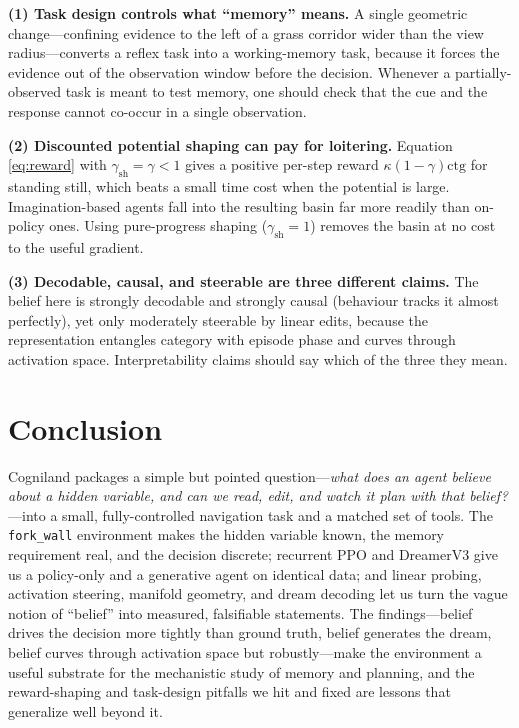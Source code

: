 \documentclass[11pt]{article}
\newcommand{\code}[1]{\texttt{\small #1}}
\newcommand{\ctg}{\mathrm{ctg}}
\begin{document}
\textbf{(1) Task design controls what ``memory'' means.} A single geometric
change---confining evidence to the left of a grass corridor wider than the view
radius---converts a reflex task into a working-memory task, because it forces the
evidence out of the observation window before the decision. Whenever a
partially-observed task is meant to test memory, one should check that the cue
and the response cannot co-occur in a single observation.

\textbf{(2) Discounted potential shaping can pay for loitering.} Equation
\eqref{eq:reward} with $\gamma_{\!\text{sh}}=\gamma<1$ gives a positive
per-step reward $\kappa(1-\gamma)\ctg$ for standing still, which beats a small
time cost when the potential is large. Imagination-based agents fall into the
resulting basin far more readily than on-policy ones. Using pure-progress shaping
($\gamma_{\!\text{sh}}=1$) removes the basin at no cost to the useful gradient.

\textbf{(3) Decodable, causal, and steerable are three different claims.} The
belief here is strongly decodable and strongly causal (behaviour tracks it almost
perfectly), yet only moderately steerable by linear edits, because the
representation entangles category with episode phase and curves through activation
space. Interpretability claims should say which of the three they mean.

\section{Conclusion}
\label{sec:conclusion}
Cogniland packages a simple but pointed question---\emph{what does an agent
believe about a hidden variable, and can we read, edit, and watch it plan with
that belief?}---into a small, fully-controlled navigation task and a matched set
of tools. The \code{fork\_wall} environment makes the hidden variable known, the
memory requirement real, and the decision discrete; recurrent PPO and DreamerV3
give us a policy-only and a generative agent on identical data; and linear
probing, activation steering, manifold geometry, and dream decoding let us turn
the vague notion of ``belief'' into measured, falsifiable statements. The
findings---belief drives the decision more tightly than ground truth, belief
generates the dream, belief curves through activation space but robustly---make
the environment a useful substrate for the mechanistic study of memory and
planning, and the reward-shaping and task-design pitfalls we hit and fixed are
lessons that generalize well beyond it.
\end{document}
